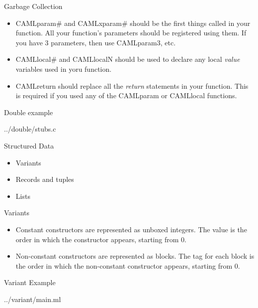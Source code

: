 \documentclass{beamer}
\begin{document}
\begin{frame}{Garbage Collection}
\begin{itemize}
    \item CAMLparam\# and CAMLxparam\# should be the first things called in your function.  All your function's
    parameters should be registered using them.  If you have 3 parameters, then use CAMLparam3, etc.
    \item CAMLlocal\# and CAMLlocalN should be used to declare any local \emph{value} variables used in yoru function.
    \item CAMLreturn should replace all the \emph{return} statements in your function.  This is required if you used
    any of the CAMLparam or CAMLlocal functions.
\end{itemize}
\end{frame}

\begin{frame}[fragile]{Double example}
\begin{lstinputlisting}[language=C]{../double/stubs.c}
\end{lstinputlisting}
\end{frame}

\begin{frame}{Structured Data}
\begin{itemize}
    \item Variants
    \item Records and tuples
    \item Lists
\end{itemize}
\end{frame}

\begin{frame}{Variants}
\begin{itemize}
    \item Constant constructors are represented as unboxed integers.  The value is the order in which the constructor
    appears, starting from 0.
    \item Non-constant constructors are represented as blocks.  The tag for each block is the order in which the
    non-constant constructor appears, starting from 0.
\end{itemize}
\end{frame}

\begin{frame}[fragile,shrink=10]{Variant Example}
\begin{lstinputlisting}[language=ML]{../variant/main.ml}
\end{lstinputlisting}
\end{frame}
\end{document}
